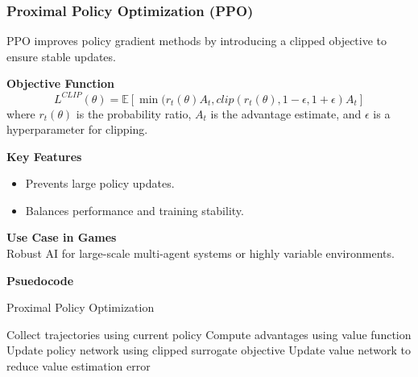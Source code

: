 \documentclass[12pt,oneside,openright,a4paper]{cpe-english-project}
\begin{document}
\subsubsection{Proximal Policy Optimization (PPO)}\cite{datacamp_ppo_tutorial}
PPO improves policy gradient methods by introducing a clipped objective to ensure stable updates.\par
\textbf{Objective Function}
\begin{equation}
L^{CLIP}(\theta) = \mathbb{E}[\min(r_{t}(\theta)A_{t}, clip(r_{t}(\theta), 1 - \epsilon, 1 + \epsilon)A_{t}]
\end{equation}
where $r_{t}(\theta)$ is the probability ratio, $A_{t}$ is the advantage estimate, and $\epsilon$ is a hyperparameter for clipping.\par
\textbf{Key Features}
\begin{itemize}
\item Prevents large policy updates.
\item Balances performance and training stability.
\end{itemize}
\textbf{Use Case in Games} \\
Robust AI for large-scale multi-agent systems or highly variable environments.\par
\textbf{Psuedocode}
\begin{algorithm}
\caption{Proximal Policy Optimization}\label{alg:PPO}
\begin{algorithmic}
\State Collect trajectories using current policy
\State Compute advantages using value function
\State Update policy network using clipped surrogate objective
\State Update value network to reduce value estimation error
\EndFor
\end{algorithmic}
\end{algorithm}
\end{document}
